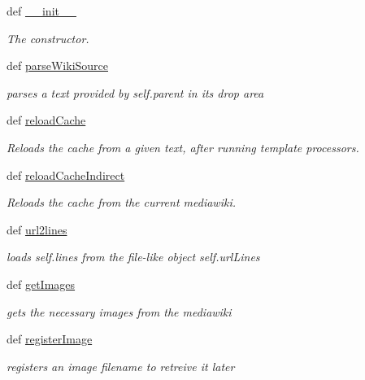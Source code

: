 \begin{DoxyCompactItemize}
\item 
def \hyperlink{classuicilibris_1_1wikiParser_1_1wikiParser_aa8c6f57cf7318e3add9818ed1c0d7acf}{\-\_\-\-\_\-init\-\_\-\-\_\-}
\begin{DoxyCompactList}\small\item\em \-The constructor. \end{DoxyCompactList}\item 
def \hyperlink{classuicilibris_1_1wikiParser_1_1wikiParser_ab8d2d05435d90a4f72b59e2c49dff14b}{parse\-Wiki\-Source}
\begin{DoxyCompactList}\small\item\em parses a text provided by self.\-parent in its drop area \end{DoxyCompactList}\item 
def \hyperlink{classuicilibris_1_1wikiParser_1_1wikiParser_aa2ad4f2c68118fbea7e8a6c51c9dc279}{reload\-Cache}
\begin{DoxyCompactList}\small\item\em \-Reloads the cache from a given text, after running template processors. \end{DoxyCompactList}\item 
def \hyperlink{classuicilibris_1_1wikiParser_1_1wikiParser_a3b0221e81ad81da455d765545a4fb008}{reload\-Cache\-Indirect}
\begin{DoxyCompactList}\small\item\em \-Reloads the cache from the current mediawiki. \end{DoxyCompactList}\item 
def \hyperlink{classuicilibris_1_1wikiParser_1_1wikiParser_af38e5cea885aed2b7fbaec3e3a682109}{url2lines}
\begin{DoxyCompactList}\small\item\em loads self.\-lines from the file-\/like object self.\-url\-Lines \end{DoxyCompactList}\item 
def \hyperlink{classuicilibris_1_1wikiParser_1_1wikiParser_a77ab07ac16780aab2763686a8a9a8fb9}{get\-Images}
\begin{DoxyCompactList}\small\item\em gets the necessary images from the mediawiki \end{DoxyCompactList}\item 
def \hyperlink{classuicilibris_1_1wikiParser_1_1wikiParser_a417e20ea54d0baa571a780ad9a272767}{register\-Image}
\begin{DoxyCompactList}\small\item\em registers an image filename to retreive it later \end{DoxyCompactList}\item 

\end{DoxyCompactItemize}
